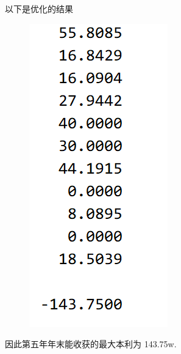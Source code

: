 \documentclass[11pt]{ctexart}
\begin{document}
    以下是优化的结果
    \begin{figure}[H]
        \centering
        \includegraphics[]{picture/exp2}
    \end{figure}

    因此第五年年末能收获的最大本利为 143.75w.

    \clearpage
\end{document}
